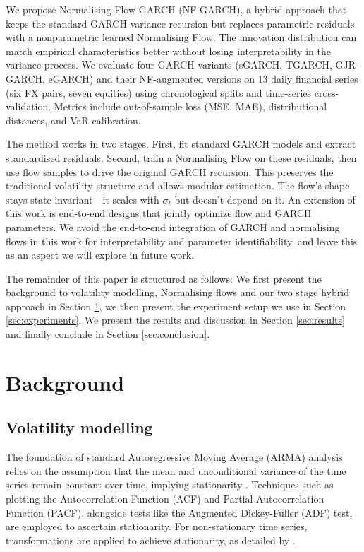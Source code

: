 \documentclass[risks,article,submit,pdftex,moreauthors]{Definitions/mdpi}
\begin{document}
We propose Normalising Flow-GARCH (NF-GARCH), a hybrid approach that keeps the standard GARCH variance recursion but replaces parametric residuals with a nonparametric learned Normalising Flow. The innovation distribution can match empirical characteristics better without losing interpretability in the variance process. We evaluate four GARCH variants (sGARCH, TGARCH, GJR-GARCH, eGARCH) and their NF-augmented versions on 13 daily financial series (six FX pairs, seven equities) using chronological splits and time-series cross-validation. Metrics include out-of-sample loss (MSE, MAE), distributional distances, and VaR calibration.


The method works in two stages. First, fit standard GARCH models and extract standardised residuals. Second, train a Normalising Flow on these residuals, then use flow samples to drive the original GARCH recursion. This preserves the traditional volatility structure and allows modular estimation. The flow's shape stays state-invariant—it scales with $\sigma_t$ but doesn't depend on it. An extension of this work is end-to-end designs that jointly optimize flow and GARCH parameters. We avoid the end-to-end integration of GARCH and normalising flows in this work for interpretability and parameter identifiability, and leave this as an aspect we will explore in future work. 

The remainder of this paper is structured as follows: We first present the background to volatility modelling, Normalising flows and our two stage hybrid approach in Section \ref{sec:background}, we then present the experiment setup we use in Section \ref{sec:experiments}. We present the results and discussion in Section \ref{sec:results} and finally conclude in Section \ref{sec:conclusion}.

\section{Background}
\label{sec:background}

\subsection{Volatility modelling}

The foundation of standard Autoregressive Moving Average (ARMA) analysis relies on the assumption that the mean and unconditional variance of the time series remain constant over time, implying stationarity \citep{BoxJenkins1976, pankratz1991forecasting}. Techniques such as plotting the Autocorrelation Function (ACF) and Partial Autocorrelation Function (PACF), alongside tests like the Augmented Dickey-Fuller (ADF) test, are employed to ascertain stationarity. For non-stationary time series, transformations are applied to achieve stationarity, as detailed by \cite{pankratz1991forecasting}.
\end{document}
